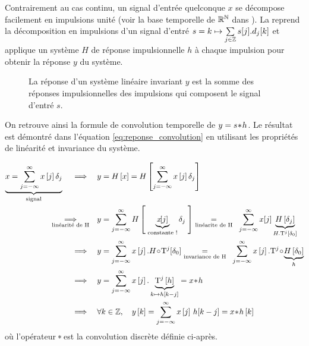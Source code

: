 Contrairement au cas continu, un signal d'entrée quelconque $x$ se
décompose facilement en impulsions unité (voir la base temporelle de
$\mathbb{R}^{\mathbb{N}}$ dans ). La 
reprend la décomposition en impulsions d'un signal d'entré
$s=k\mapsto \sum\limits_{j\in\mathbb{Z}}^{}{s[j].d_j\!\left[k\right]}$ et applique un système
$H$ de réponse impulsionnelle $h$ à chaque impulsion pour obtenir la
réponse $y$ du système.

\begin{figure}[ht!]
  \centering {}
  \caption{La réponse d'un système linéaire invariant $y$ est la somme
    des réponses impulsionnelles des impulsions qui composent le
    signal d'entré $s$.}
  \label{fig:reponse_convolution}
\end{figure}

On retrouve ainsi la formule de convolution temporelle de
$y=s\!\ast\! h$. Le résultat est démontré dans l'équation
\eqref{eq:reponse_convolution} en utilisant les propriétés de
linéarité et invariance du système.


\begin{align}
  \label{eq:reponse_convolution}
  \caCest{x = \somme{j=-\infty}{\infty}{x\b{j}\delta_{j}}}{\text{signal}}\quad \implies\quad &y=H\b{x}=H\b{\somme{j=-\infty}{\infty}{x\b{j}\delta_{j}}} \nonumber\\
  \underset{\text{linéarité de H}}{\implies}\quad &y=\somme{j=-\infty}{\infty}{H\b{ \;\caCest{x\!\!\b{j}}{\text{constante !}}\delta_{j}\;}} \underset{\text{linéarite de H}}{=} \;\;\somme{j=-\infty}{\infty}{x\!\b{j}\caCest{H\b{\delta_j}}{H.\oret^j\b{\delta_0}}} \nonumber \\
  \implies \quad &y=\somme{j=-\infty}{\infty}{x\b{j}.H\compo\oret^j\!\b{\delta_{0}}} \underset{\text{invariance de H}}{=} \;\;\somme{j=-\infty}{\infty}{x\b{j}.\oret^j\compo\caCest{H\b{\delta_{0}}}{h}}\nonumber\\
  \implies \quad & y= \somme{j=-\infty}{\infty}{x\b{j}.\caCest{\oret^j\b{h}}{k\mapsto h\b{k-j}}}=x\conv h \nonumber\\
  \implies \quad & \forall k\in\Z,\quad  y\b{k}= \somme{j=-\infty}{\infty}{x\b{j}\,h\!\b{k-j}} = x\conv h\b{k}
\end{align}
où l'opérateur $\!\ast\!$ est la convolution discrète définie ci-après.

